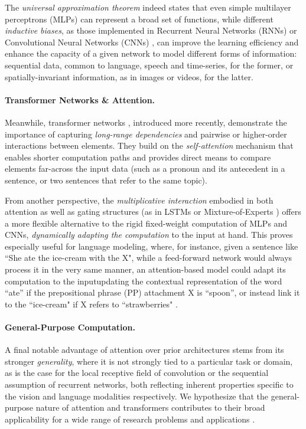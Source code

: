 The \textit{universal approximation theorem} \citep{approx} indeed states that even simple multilayer perceptrons (MLPs) can represent a broad set of functions, while different \textit{inductive biases}, as those implemented in {Recurrent Neural Networks} (RNNs) or {Convolutional Neural Networks} (CNNs) \citep{bengiobook}, can improve the learning efficiency and enhance the capacity of a given network to model different forms of information: sequential data, common to language, speech and time-series, for the former, or spatially-invariant information, as in images or videos, for the latter.

\paragraph{Transformer Networks \& Attention.} Meanwhile, transformer networks \citep{vaswani2017attention}, introduced more recently, demonstrate the importance of capturing \textit{long-range dependencies} and pairwise or higher-order interactions between elements. They build on the \textit{self-attention} mechanism \citep{vaswani2017attention,attention} that enables shorter computation paths and provides direct means to compare elements far-across the input data (such as a pronoun and its antecedent in a sentence, or two sentences that refer to the same topic).

From another perspective, the \textit{multiplicative interaction} embodied in both attention as well as gating structures (as in LSTMs \citep{lstms} or Mixture-of-Experts \citep{moe}) offers a more flexible alternative to the rigid fixed-weight computation of MLPs and CNNs, \textit{dynamically adapting the computation} to the input at hand. This proves especially useful for language modeling, where, for instance, given a sentence like ``She ate the ice-cream with the X", while a feed-forward network would always process it in the very same manner, an attention-based model could adapt its computation to the input\dash{}updating the contextual representation of the word ``ate'' if the prepositional phrase (PP) attachment X is ``spoon'', or instead link it to the ``ice-cream" if X refers \eg to ``strawberries" \citep{ppa}.

\paragraph{General-Purpose Computation.} 
A final notable advantage of attention over prior architectures stems from its stronger \textit{generality}, where it is not strongly tied to a particular task or domain, as is the case for the local receptive field of convolution or the sequential assumption of recurrent networks, both reflecting inherent properties specific to the vision and language modalities respectively. We hypothesize that the general-purpose nature of attention and transformers contributes to their broad applicability for a wide range of research problems and applications \citep{liu2019roberta,visual_transformer,ganformer}.

